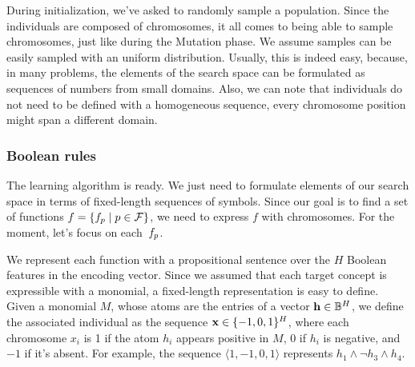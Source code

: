 During initialization, we've asked to randomly sample a population. Since the
individuals are composed of chromosomes, it all comes to being able to sample
chromosomes, just like during the Mutation phase. We assume samples can be
easily sampled with an uniform distribution. Usually, this is indeed easy,
because, in many problems, the elements of the search space can be formulated
as sequences of numbers from small domains. Also, we can note that individuals
do not need to be defined with a homogeneous sequence, every chromosome
position might span a different domain.


\subsubsection{Boolean rules}

The learning algorithm is ready. We just need to formulate elements of our
search space in terms of fixed-length sequences of symbols. Since our goal is
to find a set of functions $f = \{f_p \mid p \in \mathcal{F}\}$,
we need to express $f$ with chromosomes. For the moment, let's focus on
each~$f_p$.

We represent each function with a propositional sentence over the $H$ Boolean
features in the encoding vector. Since we assumed that each target concept is
expressible with a monomial, a fixed-length representation is easy to define.
Given a monomial $M$, whose atoms are the entries of a vector $\mathbf{h} \in \mathbb{B}^H$,
we define the associated individual as the sequence $\mathbf{x} \in \{-1, 0, 1\}^H$,
where each chromosome $x_i$ is 1 if the atom $h_i$ appears positive in $M$, 0
if $h_i$ is negative, and $-1$ if it's absent. For example, the sequence
$\langle 1, -1, 0, 1 \rangle$ represents $h_1 \land \lnot h_3 \land h_4$.

